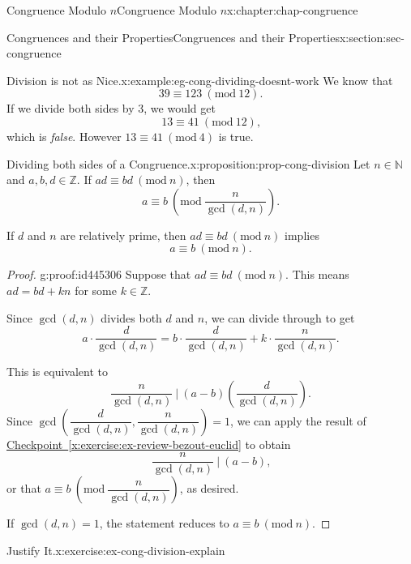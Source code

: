 \documentclass[oneside,10pt,]{book}
\newcommand{\xreffont}{\relax}
\numberwithin{equation}{section}
\newcommand{\Mod}[1]{\ \left(\mathrm{mod}\ #1\right)}
\begin{document}
\begin{chapterptx}{Congruence Modulo \(n\)}{}{Congruence Modulo \(n\)}{}{}{x:chapter:chap-congruence}
\begin{sectionptx}{Congruences and their Properties}{}{Congruences and their Properties}{}{}{x:section:sec-congruence}
\begin{example}{Division is not as Nice.}{x:example:eg-cong-dividing-doesnt-work}
We know that%
\begin{equation*}
39 \equiv 123 \Mod{12}\text{.}
\end{equation*}
If we divide both sides by 3, we would get%
\begin{equation*}
13 \equiv 41 \Mod{12}\text{,}
\end{equation*}
which is \emph{false}. However \(13 \equiv 41 \Mod{4}\) is true.%
\end{example}
\begin{proposition}{Dividing both sides of a Congruence.}{}{x:proposition:prop-cong-division}%
Let \(n \in \mathbb{N}\) and \(a,b,d \in \mathbb{Z}\). If \(ad \equiv bd \Mod{n}\), then%
\begin{equation*}
a \equiv b \Mod{\dfrac{n}{\gcd(d,n)}}\text{.}
\end{equation*}
%
\par
If \(d\) and \(n\) are relatively prime, then \(ad \equiv bd \Mod{n}\) implies%
\begin{equation*}
a \equiv b \Mod{n}\text{.}
\end{equation*}
%
\end{proposition}
\begin{proof}{}{g:proof:id445306}
Suppose that \(ad \equiv bd \Mod{n}\). This means \(ad = bd + kn\) for some \(k \in \mathbb{Z}\).%
\par
Since \(\gcd(d,n)\) divides both \(d\) and \(n\), we can divide through to get%
\begin{equation*}
a\cdot \dfrac{d}{\gcd(d,n)} = b\cdot \dfrac{d}{\gcd(d,n)} + k \cdot\dfrac{n}{\gcd(d,n)}\text{.}
\end{equation*}
%
\par
This is equivalent to%
\begin{equation*}
\dfrac{n}{\gcd(d,n)} \ \Biggl\vert \ (a-b)\left(\dfrac{d}{\gcd(d,n)}\right)\text{.}
\end{equation*}
Since \(\gcd\left(\dfrac{d}{\gcd(d,n)},\dfrac{n}{\gcd(d,n)}\right) = 1\), we can apply the result of \hyperref[x:exercise:ex-review-bezout-euclid]{Checkpoint~{\xreffont\ref{x:exercise:ex-review-bezout-euclid}}} to obtain%
\begin{equation*}
\dfrac{n}{\gcd(d,n)} \ \Biggl\vert \ (a-b)\text{,}
\end{equation*}
or that \(a \equiv b \Mod{\dfrac{n}{\gcd(d,n)}}\), as desired.%
\par
If \(\gcd(d,n) = 1\), the statement reduces to \(a \equiv b \Mod{n}\).%
\end{proof}
\begin{inlineexercise}{Justify It.}{x:exercise:ex-cong-division-explain}%

\end{inlineexercise}
\end{sectionptx}
\end{chapterptx}
\end{document}
